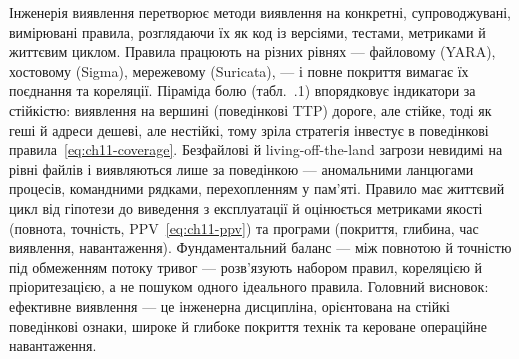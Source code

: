 Інженерія виявлення перетворює методи виявлення на конкретні, супроводжувані, вимірювані правила, розглядаючи їх як код із версіями, тестами, метриками й життєвим циклом. Правила працюють на різних рівнях --- файловому (YARA), хостовому (Sigma), мережевому (Suricata), --- і повне покриття вимагає їх поєднання та кореляції. Піраміда болю (табл.~\thechapter.1) впорядковує індикатори за стійкістю: виявлення на вершині (поведінкові TTP) дороге, але стійке, тоді як геші й адреси дешеві, але нестійкі, тому зріла стратегія інвестує в поведінкові правила~\eqref{eq:ch11-coverage}. Безфайлові й living-off-the-land загрози невидимі на рівні файлів і виявляються лише за поведінкою --- аномальними ланцюгами процесів, командними рядками, перехопленням у пам'яті. Правило має життєвий цикл від гіпотези до виведення з експлуатації й оцінюється метриками якості (повнота, точність, PPV~\eqref{eq:ch11-ppv}) та програми (покриття, глибина, час виявлення, навантаження). Фундаментальний баланс --- між повнотою й точністю під обмеженням потоку тривог --- розв'язують набором правил, кореляцією й пріоритезацією, а не пошуком одного ідеального правила. Головний висновок: ефективне виявлення --- це інженерна дисципліна, орієнтована на стійкі поведінкові ознаки, широке й глибоке покриття технік та кероване операційне навантаження.

